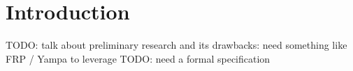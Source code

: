 \section{Introduction}

TODO: talk about preliminary research and its drawbacks: need something like FRP / Yampa to leverage
TODO: need a formal specification